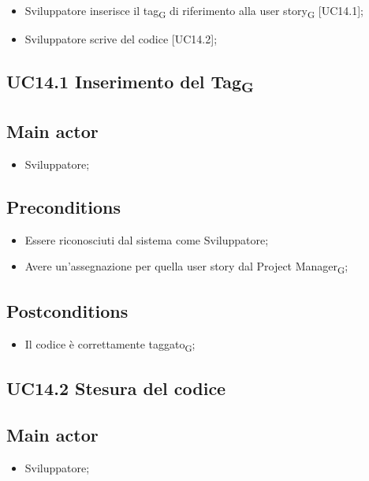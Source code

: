 \documentclass{article}
\begin{document}
        \begin{itemize}
            \item Sviluppatore inserisce il tag\textsubscript{G} di riferimento alla user story\textsubscript{G} [UC14.1];
            \item Sviluppatore scrive del codice [UC14.2];
        \end{itemize}

        \subsection{UC14.1 Inserimento del Tag\textsubscript{G}}
\subsection*{Main actor}
        \begin{itemize}
            \item Sviluppatore;
        \end{itemize}
    
    \subsection*{Preconditions}
        \begin{itemize}
            \item Essere riconosciuti dal sistema come Sviluppatore;
            \item Avere un'assegnazione per quella user story dal Project Manager\textsubscript{G};
        \end{itemize}
        
    \subsection*{Postconditions} 
        \begin{itemize}
            \item Il codice è correttamente taggato\textsubscript{G};  
        \end{itemize}

        
        \subsection{UC14.2 Stesura del codice}
\subsection*{Main actor}
        \begin{itemize}
            \item Sviluppatore;
        \end{itemize}
    
\end{document}
